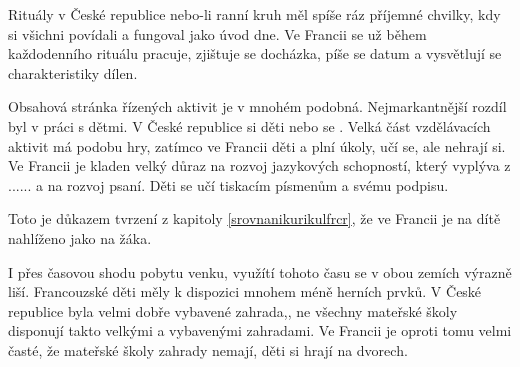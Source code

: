 	Rituály v České republice nebo-li ranní kruh měl spíše ráz příjemné chvilky, kdy si všichni povídali a fungoval jako úvod dne. Ve Francii se už během každodenního rituálu pracuje, zjištuje se docházka, píše se datum a vysvětlují se charakteristiky dílen.

	Obsahová stránka řízených aktivit je v mnohém podobná. Nejmarkantnější rozdíl byl v práci s dětmi. V České republice si děti  nebo se . Velká část vzdělávacích aktivit má podobu hry, zatímco ve Francii děti  a plní úkoly, učí se, ale nehrají si. Ve Francii je kladen velký důraz na rozvoj jazykových schopností, který vyplýva z ...... a na rozvoj psaní. Děti se učí tiskacím písmenům a svému podpisu.

	Toto je důkazem tvrzení z kapitoly \ref{srovnanikurikulfrcr}, že ve Francii je na dítě nahlíženo jako na žáka.

	I přes časovou shodu pobytu venku, využítí tohoto času se v obou zemích výrazně liší. Francouzské děti měly k dispozici mnohem méně herních prvků. V České republice byla velmi dobře vybavené zahrada,, ne všechny mateřské školy disponují takto velkými a vybavenými zahradami. Ve Francii je oproti tomu velmi časté, že mateřské školy zahrady nemají, děti si hrají na dvorech.



		
	


